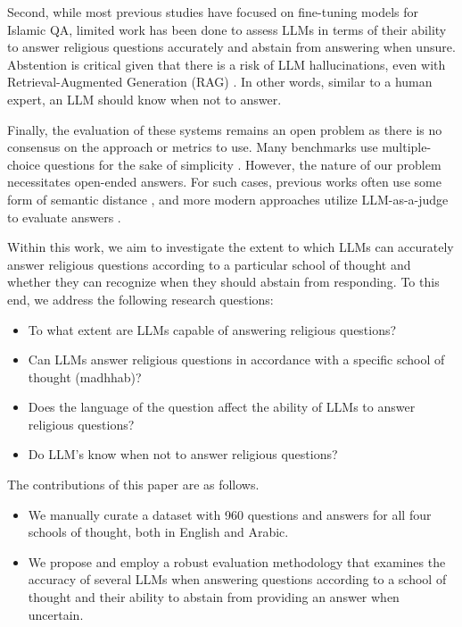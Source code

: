 \documentclass[letterpaper]{article}
\begin{document}
Second, while most previous studies have focused on fine-tuning models for Islamic QA, limited work has been done to assess LLMs in terms of their ability to answer religious questions accurately and abstain from answering when unsure. Abstention is critical given that there is a risk of LLM hallucinations, even with Retrieval-Augmented Generation (RAG) \cite{niu2023ragtruth, song2024rag}. In other words, similar to a human expert, an LLM should know when not to answer. 

Finally, the evaluation of these systems remains an open problem as there is no consensus on the approach or metrics to use. Many benchmarks use multiple-choice questions for the sake of simplicity \cite{koto2024arabicmmlu,rajpurkar2016squad}. However, the nature of our problem necessitates open-ended answers. For such cases, previous works often use some form of semantic distance \cite{zhong2022towards,zhang2019bertscore, yuan2021bartscore}, and more modern approaches utilize LLM-as-a-judge to evaluate answers \cite{kojima2022large,bai2024mt,liu2023g}. 

Within this work, we aim to investigate the extent to which LLMs can accurately answer religious questions according to a particular school of thought and whether they can recognize when they should abstain from responding. To this end, we address the following research questions:

\begin{itemize}
    \item To what extent are LLMs capable of answering religious questions?
    \item Can LLMs answer religious questions in accordance with a specific school of thought (madhhab)? 
    \item Does the language of the question affect the ability of LLMs to answer religious questions? 
    \item Do LLM's know when not to answer religious questions?
    
\end{itemize}

\noindent The contributions of this paper are as follows.
\begin{itemize}
    \item We manually curate a dataset with 960 questions and answers for all four schools of thought, both in English and Arabic.
    \item We propose and employ a robust evaluation methodology that examines the accuracy of several LLMs when answering questions according to a school of thought and their ability to abstain from providing an answer when uncertain.
\end{itemize}
\end{document}
